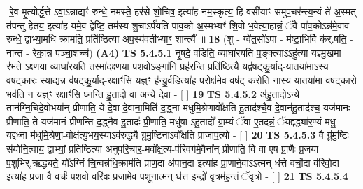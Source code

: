 \documentclass[17pt]{extarticle}
\begin{document}
                  -रे॒व मृ॒त्योर्द्ध॒त्ते ऽवा॒ऽन्नाद्यꣳ॑ रुन्धे॒ नम॑स्ते॒ हर॑से शो॒चिष॒ इत्या॑ह नम॒स्कृत्य॒ हि वसी॑याꣳ समुप॒चर॑न्त्य॒न्यं ते॑ अ॒स्मत् त॑पन्तु हे॒तय॒ इत्या॑ह॒ यमे॒व द्वेष्टि॒ तम॑स्य शु॒चाऽर्प॑यति पाव॒को अ॒स्मभ्यꣳ॑ शि॒वो भ॒वेत्या॒हान्नं॒ ॅवै पा॑व॒कोऽन्न॑मे॒वाव॑ रुन्धे॒ द्वाभ्या॒मधि॑ क्रामति॒ प्रति॑ष्ठित्या अप॒स्य॑वतीभ्याꣳ॒॒ शान्त्यै᳚ ॥ \textbf{  18 } \newline
                  \newline
                      (शु - ग्वे॑त॒सो॑ऽपा - म॑ष्टा॒भिर्वि क॑र्.षति॒ - नान्त - रेका॒न्न प॑ञ्चा॒शच्च॑)  \textbf{(A4)} \newline \newline
                                        \textbf{ TS 5.4.5.1} \newline
                  नृ॒षदे॒ वडिति॒ व्याघा॑रयति प॒ङ्क्त्याऽऽहु॑त्या यज्ञ्मु॒खमा र॑भते ऽक्ष्ण॒या व्याघा॑रयति॒ तस्मा॑दक्ष्ण॒या प॒शवोऽङ्गा॑नि॒ प्रह॑रन्ति॒ प्रति॑ष्ठित्यै॒ यद्व॑षट्कु॒र्याद्-या॒तया॑माऽस्य वषट्का॒रः स्या॒द्यन्न व॑षट्कु॒र्याद्-रक्षाꣳ॑सि य॒ज्ञ्ꣳ ह॑न्यु॒र्वडित्या॑ह प॒रोक्ष॑मे॒व वष॑ट् करोति॒ नास्य॑ या॒तया॑मा वषट्का॒रो भव॑ति॒ न य॒ज्ञ्ꣳ रक्षाꣳ॑सि घ्नन्ति हु॒तादो॒ वा अ॒न्ये दे॒वा - [  ] \textbf{  19} \newline
                  \newline
                                \textbf{ TS 5.4.5.2} \newline
                  अ॑हु॒तादो॒ऽन्ये तान॑ग्नि॒चिदे॒वोभया᳚न् प्रीणाति॒ ये दे॒वा दे॒वाना॒मिति॑ द॒द्ध्ना म॑धुमि॒श्रेणावो᳚क्षति हु॒ताद॑श्चै॒व दे॒वान॑हु॒ताद॑श्च॒ यज॑मानः प्रीणाति॒ ते यज॑मानं प्रीणन्ति द॒द्ध्नैव हु॒तादः॑ प्री॒णाति॒ मधु॑षा ऽहु॒तादो᳚ ग्रा॒म्यं ॅवा ए॒तदन्नं॒ ॅयद्दद्ध्या॑र॒ण्यं मधु॒ यद्द॒ध्ना म॑धुमि॒श्रेणा॒-वोक्ष॑त्यु॒भय॒स्याऽव॑रुद्ध्यै ग्रुमु॒ष्टिनाऽवो᳚क्षति प्राजाप॒त्यो - [  ] \textbf{  20} \newline
                  \newline
                                \textbf{ TS 5.4.5.3} \newline
                  वै ग्रु॑मु॒ष्टिः स॑योनि॒त्वाय॒ द्वाभ्यां॒ प्रति॑ष्ठित्या अनुपरि॒चार॒-मवो᳚क्ष॒त्य-प॑रिवर्गमे॒वैना᳚न् प्रीणाति॒ वि वा ए॒ष प्रा॒णैः प्र॒जया॑ प॒शुभि॑र्.ऋद्ध्यते॒ यो᳚ऽग्निं चि॒न्वन्न॑धि॒क्राम॑ति प्राण॒दा अ॑पान॒दा इत्या॑ह प्रा॒णाने॒वाऽऽत्मन् ध॑त्ते वर्चो॒दा व॑रिवो॒दा इत्या॑ह प्र॒जा वै वर्चः॑ प॒शवो॒ वरि॑वः प्र॒जामे॒व प॒शूना॒त्मन् ध॑त्त॒ इन्द्रो॑ वृ॒त्रम॑ह॒न्तं ॅवृ॒त्रो - [  ] \textbf{  21} \newline
                  \newline
                                \textbf{ TS 5.4.5.4} \newline
\end{document}
